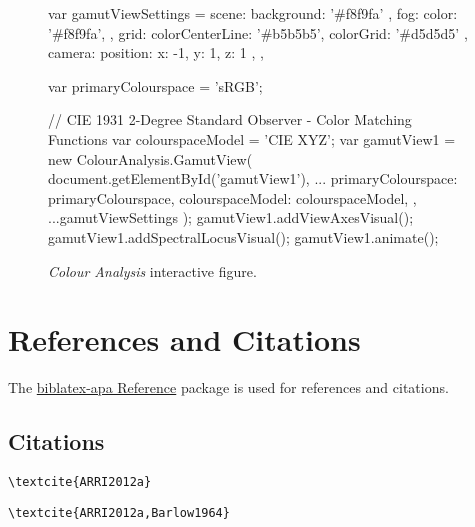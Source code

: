 \begin{figure}[H]
    \ifdefined\HCode
        \JavaScript
            var gamutViewSettings = {
                    scene: {
                        background: '#f8f9fa'
                    },
                    fog: {
                        color: '#f8f9fa',
                    },
                    grid: {
                        colorCenterLine: '#b5b5b5',
                        colorGrid: '#d5d5d5'
                    },
                    camera: {
                        position: { x: -1, y: 1, z: 1 },
                    },
            }

            var primaryColourspace = 'sRGB';

            // CIE 1931 2-Degree Standard Observer - Color Matching Functions
            var colourspaceModel = 'CIE XYZ';
            var gamutView1 = new ColourAnalysis.GamutView(
                document.getElementById('gamutView1'),
                {
                    ...{
                        primaryColourspace: primaryColourspace,
                        colourspaceModel: colourspaceModel,
                    },
                    ...gamutViewSettings
                }
            );
            gamutView1.addViewAxesVisual();
            gamutView1.addSpectralLocusVisual();
            gamutView1.animate();
        \EndJavaScript
    \fi
    \caption{\textit{Colour Analysis} interactive figure.}%
    \label{fig:colour-analysis-interactive-figure}
\end{figure}

\section*{References and Citations}%
\label{sec:references-and-citations}

The \href{https://ctan.org/pkg/biblatex-apa}{biblatex-apa Reference} package is used for references and citations.

\subsection*{Citations}%
\label{subsec:citations}

\begin{lstlisting}[caption={Citation for Single Author.}]
\textcite{ARRI2012a}
\end{lstlisting}

\textcite{ARRI2012a}

\begin{lstlisting}[caption={Citation for Multiple Authors.}]
\textcite{ARRI2012a,Barlow1964}
\end{lstlisting}

